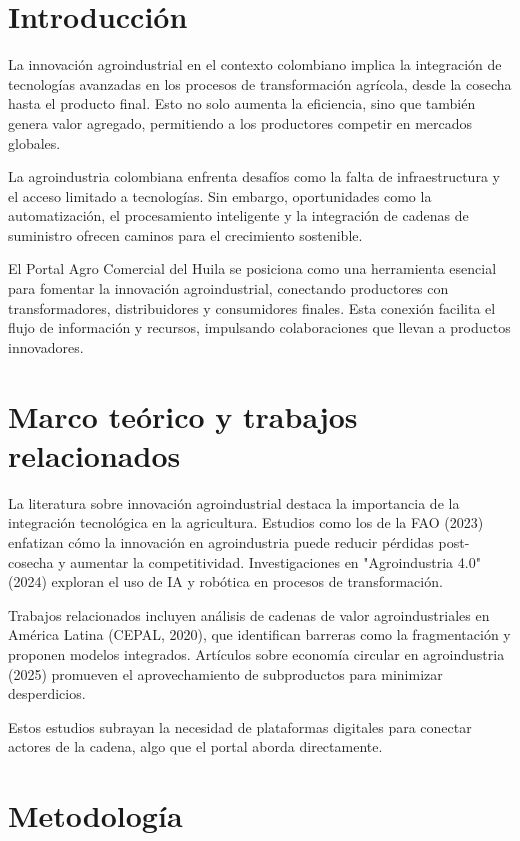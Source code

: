 \section{Introducción}

La innovación agroindustrial en el contexto colombiano implica la integración de tecnologías avanzadas en los procesos de transformación agrícola, desde la cosecha hasta el producto final. Esto no solo aumenta la eficiencia, sino que también genera valor agregado, permitiendo a los productores competir en mercados globales.

La agroindustria colombiana enfrenta desafíos como la falta de infraestructura y el acceso limitado a tecnologías. Sin embargo, oportunidades como la automatización, el procesamiento inteligente y la integración de cadenas de suministro ofrecen caminos para el crecimiento sostenible.

El Portal Agro Comercial del Huila se posiciona como una herramienta esencial para fomentar la innovación agroindustrial, conectando productores con transformadores, distribuidores y consumidores finales. Esta conexión facilita el flujo de información y recursos, impulsando colaboraciones que llevan a productos innovadores.

\section{Marco teórico y trabajos relacionados}

La literatura sobre innovación agroindustrial destaca la importancia de la integración tecnológica en la agricultura. Estudios como los de la FAO (2023) enfatizan cómo la innovación en agroindustria puede reducir pérdidas post-cosecha y aumentar la competitividad. Investigaciones en "Agroindustria 4.0" (2024) exploran el uso de IA y robótica en procesos de transformación.

Trabajos relacionados incluyen análisis de cadenas de valor agroindustriales en América Latina (CEPAL, 2020), que identifican barreras como la fragmentación y proponen modelos integrados. Artículos sobre economía circular en agroindustria (2025) promueven el aprovechamiento de subproductos para minimizar desperdicios.

Estos estudios subrayan la necesidad de plataformas digitales para conectar actores de la cadena, algo que el portal aborda directamente.

\section{Metodología}

